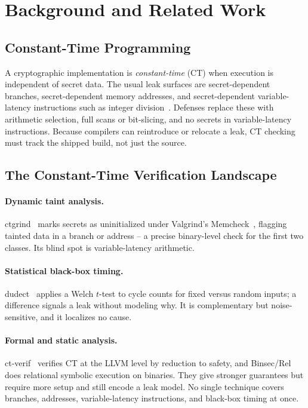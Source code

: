 \section{Background and Related Work}
\label{sec:background}

\subsection{Constant-Time Programming}

A cryptographic implementation is \emph{constant-time} (CT) when execution is
independent of secret data. The usual leak surfaces are secret-dependent
branches, secret-dependent memory addresses, and secret-dependent
variable-latency instructions such as integer division~\cite{kocher}. Defenses
replace these with arithmetic selection, full scans or bit-slicing, and no
secrets in variable-latency instructions. Because compilers can reintroduce or
relocate a leak, CT checking must track the shipped build, not just the source.

\subsection{The Constant-Time Verification Landscape}

\paragraph{Dynamic taint analysis.}
ctgrind~\cite{ctgrind} marks secrets as uninitialized under Valgrind's
Memcheck~\cite{valgrind}, flagging tainted data in a branch or address -- a
precise binary-level check for the first two classes. Its blind spot is
variable-latency arithmetic.

\paragraph{Statistical black-box timing.}
dudect~\cite{dudect} applies a Welch $t$-test to cycle counts for fixed versus
random inputs; a difference signals a leak without modeling why. It is
complementary but noise-sensitive, and it localizes no cause.

\paragraph{Formal and static analysis.}
ct-verif~\cite{ctverif} verifies CT at the LLVM level by reduction to safety,
and Binsec/Rel~\cite{binsecrel} does relational symbolic execution on binaries.
They give stronger guarantees but require more setup and still encode a leak
model. No single technique covers branches, addresses, variable-latency
instructions, and black-box timing at once.

